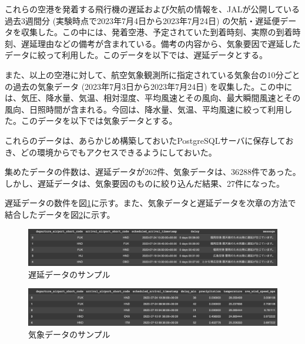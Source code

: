 \documentclass[12pt,a4paper,dvipdfmx,titlepage]{jsarticle}
\begin{document}
これらの空港を発着する飛行機の遅延および欠航の情報を、JALが公開している過去3週間分 (実験時点で2023年7月4日から2023年7月24日) の欠航・遅延便データ\cite{jalDelayData}を収集した。この中には、発着空港、予定されていた到着時刻、実際の到着時刻、遅延理由などの備考が含まれている。備考の内容から、気象要因で遅延したデータに絞って利用した。このデータを以下では、遅延データとする。

また、以上の空港に対して、航空気象観測所に指定されている気象台\cite{weatherStation}の10分ごとの過去の気象データ\cite{weatherData} (2023年7月3日から2023年7月24日) を収集した。この中には、気圧、降水量、気温、相対湿度、平均風速とその風向、最大瞬間風速とその風向、日照時間が含まれる。今回は、降水量、気温、平均風速に絞って利用した。このデータを以下では気象データとする。

これらのデータは、あらかじめ構築しておいたPostgreSQLサーバに保存しておき、どの環境からでもアクセスできるようにしておいた。

集めたデータの件数は、遅延データが262件、気象データは、36288件であった。
しかし、遅延データは、気象要因のものに絞り込んだ結果、27件になった。

遅延データの数件を図\ref{fig:delay_data_sample}に示す。また、気象データと遅延データを次章の方法で結合したデータを図\ref{fig:weather_data_sample}に示す。

\begin{figure}[htbp]
    \begin{center}
        \includegraphics[width=12cm]{img/delay_data_sample.png}
        \caption{遅延データのサンプル}
        \label{fig:delay_data_sample}
    \end{center}
\end{figure}

\begin{figure}[htbp]
    \begin{center}
        \includegraphics[width=12cm]{img/weather_data_sample.png}
        \caption{気象データのサンプル}
        \label{fig:weather_data_sample}
    \end{center}
\end{figure}
\end{document}
